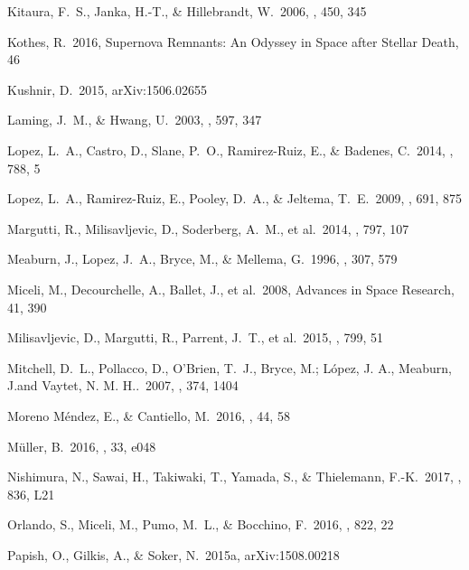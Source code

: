 \documentclass[12pt,preprint,a4paper]{aastex}
\begin{document}
\begin{thebibliography}
 Kitaura, F.~S., Janka, H.-T., \& Hillebrandt, W.\ 2006, \aap, 450, 345

  Kothes, R.\ 2016, Supernova Remnants: An Odyssey in Space after Stellar Death, 46

 Kushnir, D.\ 2015, arXiv:1506.02655

 Laming, J.~M., \& Hwang, U.\ 2003, \apj, 597, 347

 Lopez, L.~A., Castro, D., Slane, P.~O., Ramirez-Ruiz, E., \& Badenes, C.\ 2014, \apj, 788, 5 

 Lopez, L.~A., Ramirez-Ruiz, E., Pooley, D.~A., \& Jeltema, T.~E.\ 2009, \apj, 691, 875 

 Margutti, R., Milisavljevic, D., Soderberg, A.~M., et al.\ 2014, \apj, 797, 107

 Meaburn, J., Lopez, J.~A., Bryce, M., \& Mellema, G.\ 1996, \aap, 307, 579 

 Miceli, M., Decourchelle, A., Ballet, J., et al.\ 2008, Advances in Space Research, 41, 390

 Milisavljevic, D., Margutti, R., Parrent, J.~T., et al.\ 2015, \apj, 799, 51

 Mitchell, D.~L., Pollacco, D., O'Brien, T.~J., Bryce, M.; López, J. A., Meaburn, J.and Vaytet, N. M. H..\ 2007, \mnras, 374, 1404 

 Moreno M{\'e}ndez, E., \& Cantiello, M.\ 2016, \na, 44, 58

 M{\"u}ller, B.\ 2016, \pasa, 33, e048 

 Nishimura, N., Sawai, H., Takiwaki, T., Yamada, S., \& Thielemann, F.-K.\ 2017, \apjl, 836, L21 
  
 Orlando, S., Miceli, M., Pumo, M.~L., \& Bocchino, F.\ 2016, \apj, 822, 22

 Papish, O., Gilkis, A., \& Soker, N.\ 2015a, arXiv:1508.00218


\end{thebibliography}
\end{document}
